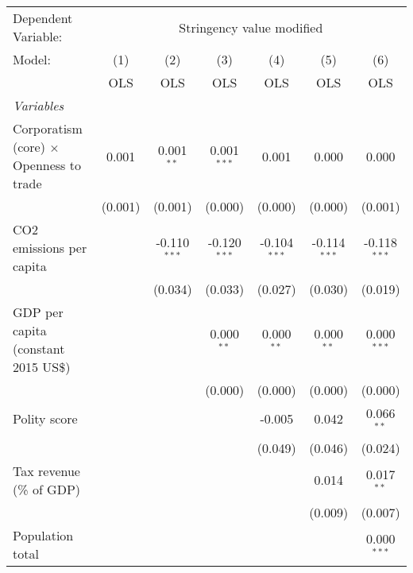 
\begingroup
\centering
\begin{tabular}{lcccccc}
   \toprule
   Dependent Variable: & \multicolumn{6}{c}{Stringency value modified}\\
   Model:                                         & (1)     & (2)            & (3)            & (4)            & (5)            & (6)\\  
                                                  &  OLS    & OLS            & OLS            & OLS            & OLS            & OLS\\  
   \midrule
   \emph{Variables}\\
   Corporatism (core) $\times$ Openness to trade  & 0.001   & 0.001$^{**}$   & 0.001$^{***}$  & 0.001          & 0.000          & 0.000\\   
                                                  & (0.001) & (0.001)        & (0.000)        & (0.000)        & (0.000)        & (0.001)\\   
   CO2 emissions per capita                       &         & -0.110$^{***}$ & -0.120$^{***}$ & -0.104$^{***}$ & -0.114$^{***}$ & -0.118$^{***}$\\   
                                                  &         & (0.034)        & (0.033)        & (0.027)        & (0.030)        & (0.019)\\   
   GDP per capita (constant 2015 US\$)            &         &                & 0.000$^{**}$   & 0.000$^{**}$   & 0.000$^{**}$   & 0.000$^{***}$\\   
                                                  &         &                & (0.000)        & (0.000)        & (0.000)        & (0.000)\\   
   Polity score                                   &         &                &                & -0.005         & 0.042          & 0.066$^{**}$\\   
                                                  &         &                &                & (0.049)        & (0.046)        & (0.024)\\   
   Tax revenue (\% of GDP)                        &         &                &                &                & 0.014          & 0.017$^{**}$\\   
                                                  &         &                &                &                & (0.009)        & (0.007)\\   
   Population total                               &         &                &                &                &                & 0.000$^{***}$\\   

\end{tabular}
